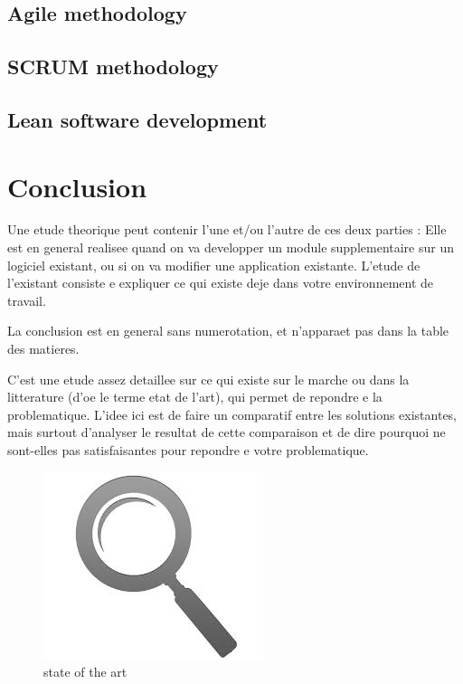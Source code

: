 \begin{spacing}{1.2}
\subsection{Agile methodology}
\subsection{SCRUM methodology}
\subsection{Lean software development}
\section*{Conclusion}


Une etude theorique \cite{YOUSFI2015} peut contenir l'une et/ou l'autre de ces deux parties :
Elle est en general realisee quand on va developper un module supplementaire sur un 
logiciel existant, ou si on va modifier une application existante. L'etude de l'existant
consiste e expliquer ce qui existe deje dans votre environnement de travail.


La conclusion est en general sans numerotation, et n'apparaet pas dans la table des matieres.

C'est une etude assez detaillee sur ce qui existe sur le marche ou dans la litterature (d'oe 
le terme etat de l'art), qui permet de repondre e la problematique. L'idee ici est de faire 
un comparatif entre les solutions existantes, mais surtout d'analyser le resultat de cette 
comparaison et de dire pourquoi ne sont-elles pas satisfaisantes pour repondre e votre 
problematique.
\begin{figure}[!ht]\centering
\includegraphics[scale=0.9]{art.jpg}
\caption{state of the art}
\label{fig:fig1}
\end{figure}





\end{spacing}
